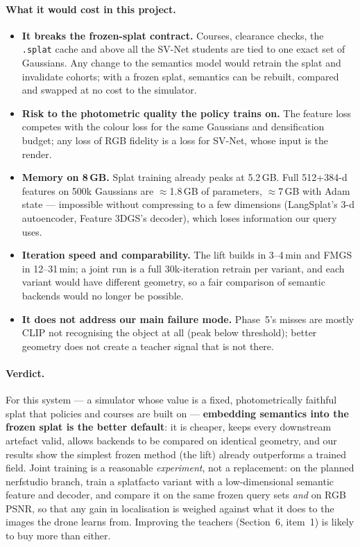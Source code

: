 \documentclass[11pt,a4paper]{article}
\newcommand{\code}[1]{\texttt{#1}}
\begin{document}
\paragraph{What it would cost in this project.}
\begin{itemize}
  \item \textbf{It breaks the frozen-splat contract.} Courses, clearance checks, the \code{.splat}
        cache and above all the SV-Net students are tied to one exact set of Gaussians. Any change
        to the semantics model would retrain the splat and invalidate cohorts; with a frozen splat,
        semantics can be rebuilt, compared and swapped at no cost to the simulator.
  \item \textbf{Risk to the photometric quality the policy trains on.} The feature loss competes with the
        colour loss for the same Gaussians and densification budget; any loss of RGB fidelity is a
        loss for SV-Net, whose input is the render.
  \item \textbf{Memory on 8\,GB.} Splat training already peaks at 5.2\,GB. Full 512+384-d features on
        500k Gaussians are $\approx$1.8\,GB of parameters, $\approx$7\,GB with Adam state --- impossible
        without compressing to a few dimensions (LangSplat's 3-d autoencoder, Feature 3DGS's decoder),
        which loses information our query uses.
  \item \textbf{Iteration speed and comparability.} The lift builds in 3--4\,min and FMGS in 12--31\,min;
        a joint run is a full 30k-iteration retrain per variant, and each variant would have
        different geometry, so a fair comparison of semantic backends would no longer be possible.
  \item \textbf{It does not address our main failure mode.} Phase~5's misses are mostly CLIP not
        recognising the object at all (peak below threshold); better geometry does not create a
        teacher signal that is not there.
\end{itemize}

\paragraph{Verdict.} For this system --- a simulator whose value is a fixed, photometrically faithful
splat that policies and courses are built on --- \textbf{embedding semantics into the frozen splat is
the better default}: it is cheaper, keeps every downstream artefact valid, allows backends to be
compared on identical geometry, and our results show the simplest frozen method (the lift) already
outperforms a trained field. Joint training is a reasonable \emph{experiment}, not a replacement: on
the planned nerfstudio branch, train a splatfacto variant with a low-dimensional semantic feature
and decoder, and compare it on the same frozen query sets \emph{and} on RGB PSNR, so that any gain in
localisation is weighed against what it does to the images the drone learns from. Improving the
teachers (Section~6, item~1) is likely to buy more than either.
\end{document}
